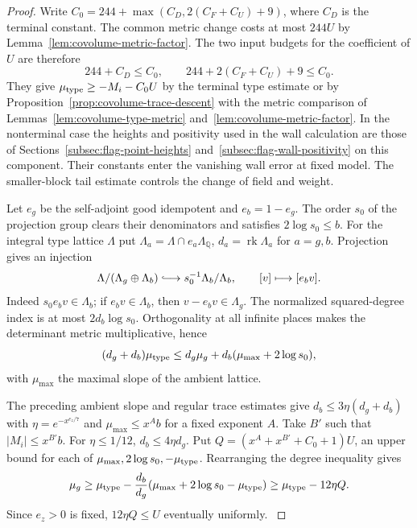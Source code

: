 \begin{proof}
Write \(C_0=244+\max(C_D,2(C_F+C_U)+9)\), where \(C_D\)
is the terminal constant. The common metric change costs at
most \(244U\) by Lemma~\ref{lem:covolume-metric-factor}. The two input
budgets for the coefficient of \(U\) are therefore
\[
 244+C_D\le C_0,\qquad 244+2(C_F+C_U)+9\le C_0 .
\]
They give \(\mu_{\rm type}\ge-M_i-C_0 U\) by the terminal type estimate or by
Proposition~\ref{prop:covolume-trace-descent} with the metric
comparison of Lemmas~\ref{lem:covolume-type-metric} and~\ref{lem:covolume-metric-factor}. In the nonterminal case the heights and positivity
used in the wall calculation are those of Sections~\ref{subsec:flag-point-heights}
and~\ref{subsec:flag-wall-positivity} on this component. Their constants
enter the vanishing wall error at fixed model. The smaller-block tail
estimate controls the change of field and weight.

Let \(e_g\) be the self-adjoint good idempotent and
\(e_b=1-e_g\). The order \(s_0\) of the projection group clears
their denominators and satisfies \(2\log s_0\le b\). For the
integral type lattice \(\Lambda\) put
\(\Lambda_a=\Lambda\cap e_a\Lambda_{\mathbb Q}\),
\(d_a=\operatorname{rk}\Lambda_a\) for \(a=g,b\).
Projection gives an injection
\[
 \Lambda/(\Lambda_g\oplus\Lambda_b)
 \lhook\joinrel\longrightarrow s_0^{-1}\Lambda_b/\Lambda_b,
 \qquad [v]\longmapsto[e_bv].
\]
Indeed \(s_0e_bv\in\Lambda_b\); if \(e_bv\in\Lambda_b\), then
\(v-e_bv\in\Lambda_g\). The normalized squared-degree index
is at most \(2d_b\log s_0\). Orthogonality at all infinite
places makes the determinant metric multiplicative, hence
\[
 (d_g+d_b)\mu_{\rm type}\le
 d_g\mu_g+d_b(\mu_{\max}+2\log s_0),
\]
with \(\mu_{\max}\) the maximal slope of the ambient
lattice.

The preceding ambient slope and regular trace estimates give
\(d_b\le3\eta(d_g+d_b)\) with
\(\eta=e^{-x^{e_z/7}}\) and
\(\mu_{\max}\le x^A b\) for a fixed exponent \(A\).
Take \(B'\) such that \(|M_i|\le x^{B'}b\).
For \(\eta\le1/12\), \(d_b\le4\eta d_g\). Put
\(Q=(x^A+x^{B'}+C_0+1)U\), an upper bound for each of
\(\mu_{\max},2\log s_0,-\mu_{\rm type}\). Rearranging the degree
inequality gives
\[
 \mu_g\ge\mu_{\rm type}
 -\frac{d_b}{d_g}(\mu_{\max}+2\log s_0-\mu_{\rm type})
 \ge\mu_{\rm type}-12\eta Q .
\]
Since \(e_z>0\) is fixed, \(12\eta Q\le U\) eventually uniformly.
\label{cor:covolume-component-transfer-22}


\end{proof}
